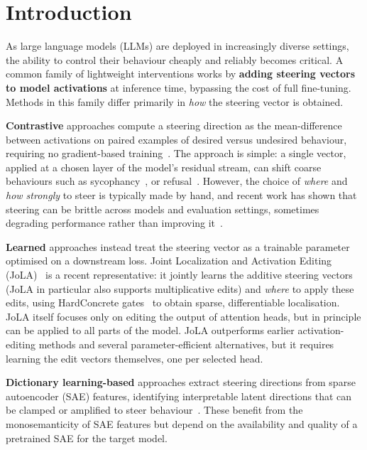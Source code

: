 \section{Introduction}

As large language models (LLMs) are deployed in increasingly diverse settings, the ability to control their behaviour cheaply and reliably becomes critical.
A common family of lightweight interventions works by \textbf{adding steering vectors to model activations} at inference time, bypassing the cost of full fine-tuning.
Methods in this family differ primarily in \emph{how} the steering vector is obtained.

\textbf{Contrastive} approaches compute a steering direction as the mean-difference between activations on paired examples of desired versus undesired behaviour, requiring no gradient-based training~\cite{turner2025actadd,rimsky2024caa}.
The approach is simple: a single vector, applied at a chosen layer of the model's residual stream, can shift coarse behaviours such as sycophancy~\cite{rimsky2024caa}, or refusal~\cite{arditi2024refusal}.
However, the choice of \emph{where} and \emph{how strongly} to steer is typically made by hand, and recent work has shown that steering can be brittle across models and evaluation settings, sometimes degrading performance rather than improving it~\cite{dasilva2025steering}.

\textbf{Learned} approaches instead treat the steering vector as a trainable parameter optimised on a downstream loss. Joint Localization and Activation Editing (JoLA)~\cite{lai2025jola} is a recent representative: it jointly learns the additive steering vectors (JoLA in particular also supports multiplicative edits) and \emph{where} to apply these edits, using HardConcrete gates~\cite{louizos2018hardconcrete} to obtain sparse, differentiable localisation. JoLA itself focuses only on editing the output of attention heads, but in principle can be applied to all parts of the model. JoLA outperforms earlier activation-editing methods and several parameter-efficient alternatives, but it requires learning the edit vectors themselves, one per selected head.

\textbf{Dictionary learning-based} approaches extract steering directions from sparse autoencoder (SAE) features, identifying interpretable latent directions that can be clamped or amplified to steer behaviour~\cite{templeton2024scaling}. These benefit from the monosemanticity of SAE features but depend on the availability and quality of a pretrained SAE for the target model.


